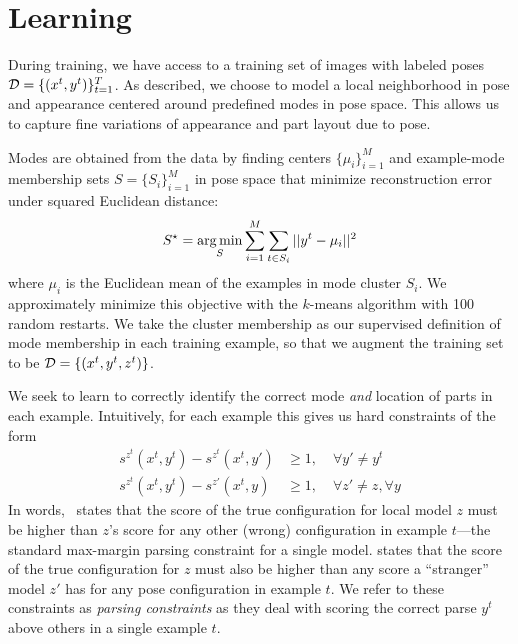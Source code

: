 \section{Learning}\label{sec:llps-learning}

During training, we have access to a training set of images with labeled poses 
$\mathcal{D} = \{(x^{t},y^{t})\}_{t=1}^T$.  As described, we choose to model a local 
neighborhood in pose and appearance centered around predefined modes in pose 
space.  This allows us to capture fine variations of appearance and part layout
due to pose.

Modes are obtained from the data by finding centers $\{\mu_i \}_{i=1}^M$ and 
example-mode membership sets $S = \{S_i\}_{i=1}^M$ in pose space that minimize 
reconstruction error under squared Euclidean distance:
\begin{align}
S^\star = \mathop{\arg\min}_{S} \sum_{i=1}^M \sum_{t \in S_i} ||y^{t} - \mu_i||^2
\end{align}
where $\mu_i$ is the Euclidean mean of the examples in mode cluster $S_i$.  We 
approximately minimize this objective with the $k$-means algorithm with 100 
random restarts.  We take the cluster membership as our supervised definition 
of mode membership in each training example, so that we augment the training 
set to be $\mathcal{D} = \{(x^t,y^t,z^t)\}$. 

  We seek to learn to correctly identify the 
correct mode {\em and } location of parts in each example.  Intuitively, for 
each example this gives us hard constraints of the form \begin{align}
s^{z^t}(x^t,y^t) - s^{z^t}(x^t,y') &\geq 1,\; &\forall y' \neq y^t 
\label{eq:c1} \\
s^{z^t}(x^t,y^t) - s^{z'}(x^t,y) &\geq 1 ,\; &\forall z' \neq z, \forall y 
\label{eq:c2}
\end{align}
In words,~ states that the score of the true configuration for local 
model $z$ must be higher than $z$'s score for any other (wrong) configuration 
in example $t$---the standard max-margin parsing constraint for a single model.  
 states that the score of the true configuration for $z$ must also 
be higher than any score a ``stranger'' model $z'$ has for any pose 
configuration in example $t$.  We refer to these constraints as {\em parsing
constraints} as they deal with scoring the correct parse $y^t$ above others in 
a single example $t$.

